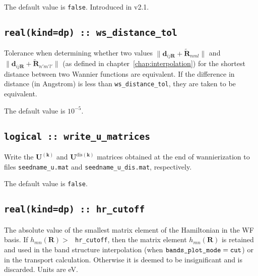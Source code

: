 The default value is {\tt false}. Introduced in v2.1.

\subsection[ws\_distance\_tol]{\tt real(kind=dp) :: ws\_distance\_tol}

Tolerance when determining whether two values $\|\mathbf{d}_{ij\mathbf{R}} + \tilde{\mathbf{R}}_{nml} \|$ and $\|\mathbf{d}_{ij\mathbf{R}} + \tilde{\mathbf{R}}_{n'm'l'} \|$ (as defined in chapter~\ref{chap:interpolation}) for the shortest distance between two Wannier functions are equivalent. If the difference in distance (in Angstrom) is less than \texttt{ws\_distance\_tol}, they are taken to be equivalent.

The default value is $10^{-5}$.

\subsection[write\_u\_matrices]{\tt logical :: write\_u\_matrices}

Write the $\mathbf{U}^{(\mathbf{k})}$ and $\mathbf{U}^{\mathrm{dis}(\mathbf{k})}$ matrices obtained at the end of wannierization to files
{\tt seedname\_u.mat} and {\tt seedname\_u\_dis.mat}, respectively.

The default value is {\tt false}.


\subsection[hr\_cutoff]{\tt real(kind=dp) :: hr\_cutoff}

The absolute value of the smallest matrix element of the
Hamiltonian in the WF basis.
If $h_{mn}(\mathbf{R})>\:${\tt
  hr\_cutoff}, then the matrix element
$h_{mn}(\mathbf{R})$ is retained and used in
the band structure interpolation (when $\verb#bands_plot_mode#=\verb#cut#$)
or in the transport calculation.
Otherwise it is deemed to be insignificant
and is discarded. Units are eV.


